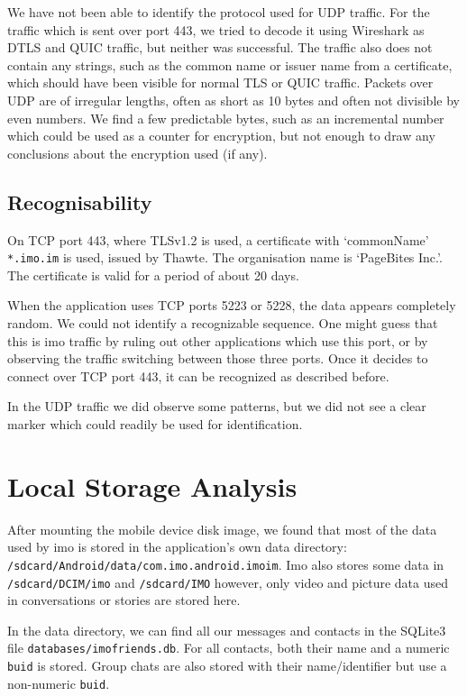 \documentclass[conference]{IEEEtran}
\begin{document}
We have not been able to identify the protocol used for UDP traffic. For the
traffic which is sent over port 443, we tried to decode it using Wireshark as
DTLS and QUIC traffic, but neither was successful. The traffic also does not
contain any strings, such as the common name or issuer name from a certificate,
which should have been visible for normal TLS or QUIC traffic. Packets over UDP
are of irregular lengths, often as short as 10 bytes and often not divisible by
even numbers. We find a few predictable bytes, such as an incremental number
which could be used as a counter for encryption, but not enough to draw any
conclusions about the encryption used (if any).


\subsection{Recognisability}

On TCP port 443, where TLSv1.2 is used, a certificate with `commonName'
\texttt{*.imo.im} is used, issued by Thawte. The organisation name is
`PageBites Inc.'. The certificate is valid for a period of about 20 days.

When the application uses TCP ports 5223 or 5228, the data appears completely
random. We could not identify a recognizable sequence. One might guess that
this is imo traffic by ruling out other applications which use this port, or by
observing the traffic switching between those three ports. Once it decides to
connect over TCP port 443, it can be recognized as described before.

In the UDP traffic we did observe some patterns, but we did not see a clear
marker which could readily be used for identification.


\section{Local Storage Analysis}\label{sec:storage}

After mounting the mobile device disk image, we found that most of the data
used by imo is stored in the application's own data directory:
\texttt{/sdcard/Android/data/com.imo.android.imoim}. Imo also stores some data
in \texttt{/sdcard/DCIM/imo} and \texttt{/sdcard/IMO} however, only video and
picture data used in conversations or stories are stored here.

In the data directory, we can find all our messages and contacts in the SQLite3
file \texttt{databases/imofriends.db}. For all contacts, both their name and a
numeric \texttt{buid} is stored. Group chats are also stored with their
name/identifier but use a non-numeric \texttt{buid}.
\end{document}
